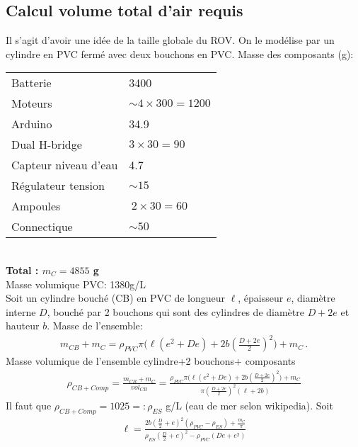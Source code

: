 \documentclass[11pt,a4paper]{article}
\begin{document}
    \subsection{Calcul volume total d'air requis}
      Il s'agit d'avoir une idée de la taille globale du ROV. On le modélise par un cylindre en PVC fermé avec deux bouchons en PVC.
      Masse des composants (g):\\
      
      \begin{tabular}{ll}
        Batterie & 3400\\
        Moteurs & $\sim 4\times 300= 1200 $\\
        Arduino & 34.9\\
        Dual H-bridge & $3\times 30 =90$\\
        Capteur niveau d'eau & 4.7\\
        Régulateur tension & $\sim 15$\\
        Ampoules & $~2 \times 30=60$\\
        Connectique & $\sim 50$\\
      \end{tabular}\\
      
      {\bf Total : $m_C = 4855$ g}\\
      
      Masse volumique PVC: 1380g/L\\
      Soit un cylindre bouché (CB) en PVC de longueur $\ell$, épaisseur $e$, diamètre interne $D$, bouché par 2 bouchons qui sont des cylindres de diamètre $D+2e$ et hauteur $b$. Masse de l'ensemble:
      \begin{align*}
        m_{CB} + m_C= \rho_{PVC} \pi \big( \ell(e^2 + De) + 2b(\tfrac{D+2e}{2})^2\big) + m_C\,.
      \end{align*}
      Masse volumique de l'ensemble cylindre+2 bouchons+ composants
      \begin{align}
          \rho_{CB+Comp} = \tfrac{m_{CB}+m_C}{vol_{CB}} = \tfrac{\rho_{PVC} \pi \big( \ell(e^2 + De) + 2b(\tfrac{D+2e}{2})^2\big) + m_C}{\pi(\tfrac{D+2e}{2})^2(\ell+2b)}%
      \end{align}
      Il faut que $\rho_{CB+Comp} = 1025 =: \rho_{ES}$ g/L (eau de mer selon wikipedia). Soit
      \begin{align}
        \ell = \tfrac{2b(\tfrac{D}{2}+e)^2(\rho_{PVC}-\rho_{ES}) + \tfrac{m_C}{\pi}}{\rho_{ES}(\tfrac{D}{2}+e)^2-\rho_{PVC}(De+e^2)}
      \end{align}
      
\end{document}

